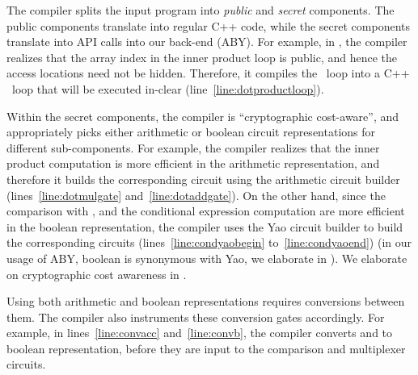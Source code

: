 The compiler splits the input
program into \emph{public} and \emph{secret} components. The public
components translate into regular C++ code, while the secret
components translate into API calls into our \mpc back-end
(ABY). For example, in , the \tool
compiler realizes that the array index  in the inner product loop
is public, and hence the access locations need not be hidden.
Therefore, it compiles the ~loop into a C++
~loop that will be executed in-clear
(line~\ref{line:dotproductloop}).

Within the secret components, the \tool compiler is ``cryptographic
cost-aware'', and appropriately picks either arithmetic or boolean
circuit representations for different sub-components. For example,
the compiler realizes that the inner product computation is more
efficient in the arithmetic representation, and therefore it builds
the corresponding circuit using the arithmetic circuit builder
 (lines~\ref{line:dotmulgate} and~\ref{line:dotaddgate}). On
the other hand, since the comparison with , and the conditional
expression computation are more efficient in the boolean
representation, the \tool compiler uses the Yao circuit builder
 to build the corresponding circuits
(lines~\ref{line:condyaobegin} to~\ref{line:condyaoend}) (in our usage
of ABY, boolean is synonymous with Yao, we elaborate in ).
We elaborate on cryptographic cost awareness in .

Using both arithmetic and boolean representations requires conversions between them.
The \tool compiler also
instruments these conversion gates accordingly. For example, in
lines~\ref{line:convacc} and~\ref{line:convb}, the compiler converts
 and  to boolean representation, before they are
input to the comparison and multiplexer circuits.

